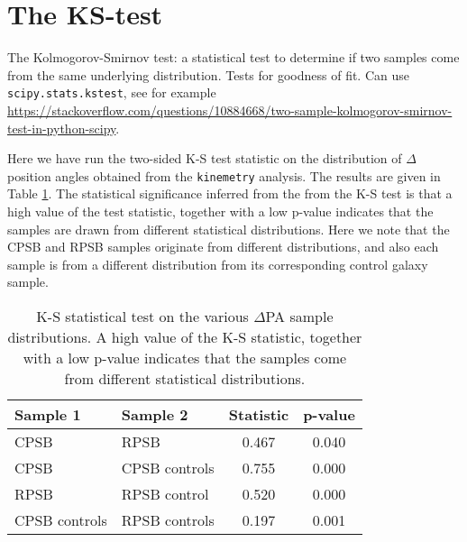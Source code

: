 \section{The KS-test}
The Kolmogorov-Smirnov test: a statistical test to determine if two samples come from the same underlying distribution. Tests for goodness of fit. Can use \texttt{scipy.stats.kstest}, see for example \url{https://stackoverflow.com/questions/10884668/two-sample-kolmogorov-smirnov-test-in-python-scipy}.

Here we have run the two-sided K-S test statistic on the distribution of $\Delta$ position angles obtained from the \texttt{kinemetry} analysis. The results are given in Table \ref{tab:K-S-tests}. The statistical significance inferred from the from the K-S test is that a high value of the test statistic, together with a low p-value indicates that the samples are drawn from different statistical distributions. Here we note that the CPSB and RPSB samples originate from different distributions, and also each sample is from a different distribution from its corresponding control galaxy sample.

\begin{table}
\caption{K-S statistical test on the various $\Delta$PA sample distributions. A high value of the K-S statistic, together with a low p-value indicates that the samples come from different statistical distributions.}
\label{tab:K-S-tests}
\begin{tabular}{llcc}
\hline
Sample 1  & Sample 2 & Statistic & p-value \\
\hline
CPSB & RPSB & 0.467 & 0.040 \\
CPSB & CPSB controls & 0.755 & 0.000 \\
RPSB & RPSB control & 0.520 & 0.000 \\
CPSB controls & RPSB controls & 0.197 & 0.001 \\
\hline
\end{tabular}
\end{table}
